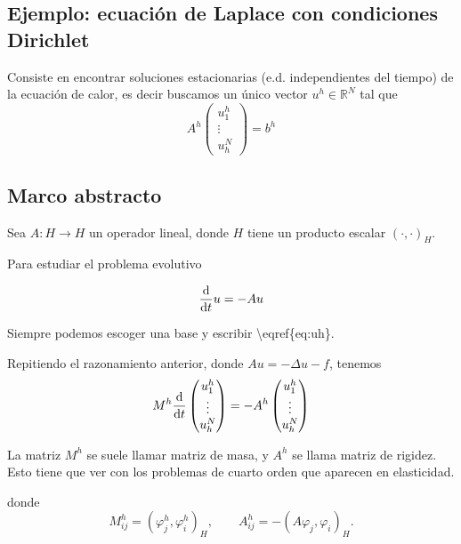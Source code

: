 \subsection{Ejemplo: ecuación de Laplace con condiciones
    Dirichlet}\label{ejemplo-ecuaciuxf3n-de-laplace-con-condiciones-dirichlet}

Consiste en encontrar soluciones estacionarias (e.d. independientes del
tiempo) de la ecuación de calor, es decir buscamos un único vector
\(u^h \in \mathbb R^N\) tal que \[
    A^h
    \begin{pmatrix} u_1^h \\ \vdots \\ u^N_h \end{pmatrix}
    =
    b^h
\]

\subsection{Marco abstracto
}\label{marco-abstracto-scrollable}

Sea \(A: H \to H\) un operador lineal, donde \(H\) tiene un producto
escalar \((\cdot, \cdot)_H\).



Para estudiar el problema evolutivo

\[
    \frac{\mathrm{d}}{\mathrm{d} t} u = - A u
\]



Siempre podemos escoger una base y escribir
\textbackslash eqref\{eq:uh\}.



Repitiendo el razonamiento anterior, donde \(Au = - \Delta u - f\),
tenemos \[
    M^h
    \frac{\mathrm{d} }{\mathrm{d} t}
    \begin{pmatrix} u_1^h \\ \vdots \\ u^N_h \end{pmatrix}
    = -
    A^h
    \begin{pmatrix} u_1^h \\ \vdots \\ u^N_h \end{pmatrix}
\]



La matriz \(M^h\) se suele llamar matriz de masa, y \(A^h\) se llama
matriz de rigidez. Esto tiene que ver con los problemas de cuarto orden
que aparecen en elasticidad.



donde \[
    M^h_{ij} = (\varphi_j^h, \varphi_i^h)_H , \qquad A_{ij}^h = - (A \varphi_j, \varphi_i)_H.
\]



